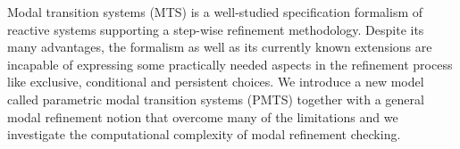 Modal transition systems (MTS) is a well-studied specification formalism of 
reactive systems supporting a step-wise refinement methodology.
Despite its many advantages, the formalism as well as its currently
known extensions are incapable of expressing some practically needed aspects 
in the refinement process like exclusive, conditional and persistent choices.
We introduce a new model called parametric modal transition systems (PMTS) 
together with a general
modal refinement notion that overcome
many of the limitations and we investigate the computational complexity 
of modal refinement checking. 
